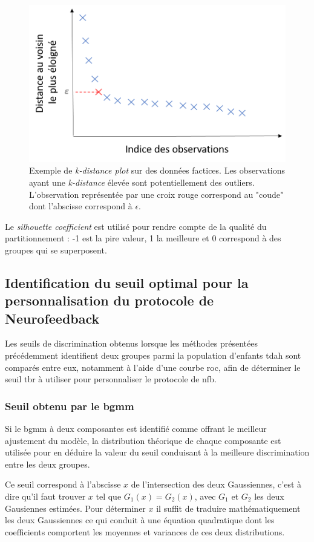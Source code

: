 \begin{figure}[h!]
  \centering
	\includegraphics[width=0.7\linewidth]{figures/chapter-4/tbr-k-distance-plot-example} 
  \caption[Exemple de \textit{k-distance plot} sur des données factices.]{Exemple de \textit{k-distance plot} sur des données factices. Les observations 
	ayant une \textit{k-distance} élevée sont potentiellement
	des outliers. L'observation représentée par une croix rouge correspond au "coude" dont l'abscisse correspond à $\epsilon$.} 
	\label{Figure:tbr_k_distance_plot_example} 
\end{figure}

Le \textit{silhouette coefficient} est utilisé pour rendre compte de la qualité du partitionnement : -1 est la pire valeur, 1 la meilleure et 0
correspond à des groupes qui se superposent.

\subsection{Identification du seuil optimal pour la personnalisation du protocole de Neurofeedback}

Les seuils de discrimination obtenus lorsque les méthodes présentées précédemment identifient deux groupes parmi la population d'enfants \gls{tdah} 
sont comparés entre eux, notamment à l'aide d'une courbe \gls{roc}, afin de déterminer le seuil \gls{tbr} à utiliser pour personnaliser le protocole de \gls{nfb}. 

\subsubsection{Seuil obtenu par le \gls{bgmm}}
Si le \gls{bgmm} à deux composantes est identifié comme offrant le meilleur ajustement du modèle, la distribution théorique de chaque composante 
est utilisée pour en déduire la valeur du seuil conduisant à la meilleure discrimination entre les deux groupes. 

Ce seuil correspond à l'abscisse $x$ de l'intersection des deux Gaussiennes, c'est à dire qu'il faut trouver $x$ tel que $G_1(x) = G_2(x)$, avec $G_1$ et $G_2$ les deux Gausiennes estimées. 
Pour déterminer $x$ il suffit de traduire mathématiquement les deux Gaussiennes ce qui
conduit à une équation quadratique dont les coefficients comportent les moyennes et variances de ces deux distributions.

